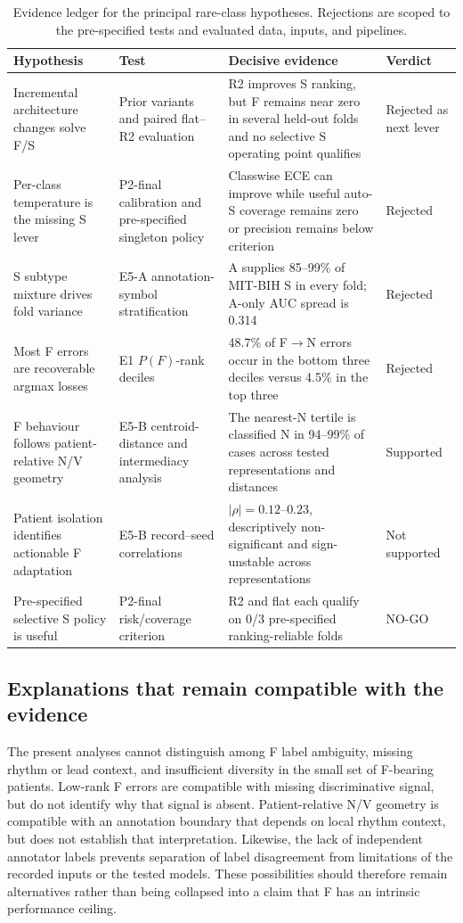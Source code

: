 \documentclass[review,12pt]{elsarticle}
\begin{document}
\begin{table}[htbp]
\caption{Evidence ledger for the principal rare-class hypotheses. Rejections
are scoped to the pre-specified tests and evaluated data, inputs, and pipelines.}
\label{tab:hypothesis-ledger}
\centering
\scriptsize
\begin{tabular}{@{}p{}p{}p{}p{}@{}}
\toprule
Hypothesis & Test & Decisive evidence & Verdict \\
\midrule
Incremental architecture changes solve F/S & Prior variants and paired flat--R2
evaluation & R2 improves S ranking, but F remains near zero in several held-out
folds and no selective S operating point qualifies & Rejected as next lever \\
Per-class temperature is the missing S lever & P2-final calibration and
pre-specified singleton policy & Classwise ECE can improve while useful auto-S
coverage remains zero or precision remains below criterion & Rejected \\
S subtype mixture drives fold variance & E5-A annotation-symbol stratification
& A supplies 85--99\% of MIT-BIH S in every fold; A-only AUC spread is 0.314 &
Rejected \\
Most F errors are recoverable argmax losses & E1 $P(F)$-rank deciles & 48.7\%
of F$\rightarrow$N errors occur in the bottom three deciles versus 4.5\% in the
top three & Rejected \\
F behaviour follows patient-relative N/V geometry & E5-B centroid-distance and
intermediacy analysis & The nearest-N tertile is classified N in 94--99\% of
cases across tested representations and distances & Supported \\
Patient isolation identifies actionable F adaptation & E5-B record--seed
correlations & $|\rho|=0.12$--$0.23$, descriptively non-significant and
sign-unstable across representations & Not supported \\
Pre-specified selective S policy is useful & P2-final risk/coverage criterion & R2
and flat each qualify on 0/3 pre-specified ranking-reliable folds & NO-GO \\
\bottomrule
\end{tabular}
\end{table}

\subsection{Explanations that remain compatible with the evidence}
The present analyses cannot distinguish among F label ambiguity, missing rhythm
or lead context, and insufficient diversity in the small set of F-bearing
patients. Low-rank F errors are compatible with missing discriminative signal,
but do not identify why that signal is absent. Patient-relative N/V geometry is
compatible with an annotation boundary that depends on local rhythm context,
but does not establish that interpretation. Likewise, the lack of independent
annotator labels prevents separation of label disagreement from limitations of
the recorded inputs or the tested models. These possibilities should therefore
remain alternatives rather than being collapsed into a claim that F has an
intrinsic performance ceiling.
\end{document}
